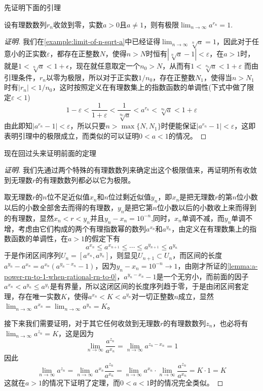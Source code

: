 先证明下面的引理
\begin{lemma}
  \label{lemma:a-power-rn-to-1-when-rational-rn-to-0}
  设有理数数列$r_n$收敛到零，实数$a>0$且$a \neq 1$，则有极限$\lim_{n \to \infty} a^{r_n} = 1$.
\end{lemma}

\begin{proof}[证明]
  我们在\autoref{example:limit-of-n-sqrt-a}中已经证得$\lim_{n \to \infty} \sqrt[n]{a} = 1$，因此对于任意小的正实数$\varepsilon$，都存在正整数$N$，使得$n>N$时恒有$|\sqrt[n]{a}-1|<\varepsilon$，在$a>1$时，就是$1<\sqrt[n]{a}<1+\epsilon$，现在就任意取定一个$n_0>N$，从而有$1<\sqrt[n_0]{a}<1+\varepsilon$ 而由引理条件，$r_n$以零为极限，所以对于正实数$1/n_0$，存在正整数$N_1$，使得当$n>N_1$时有$|r_n|<1/n_0$，这时按照定义在有理数集上的指数函数的单调性(下式中做了限定$\varepsilon<1$)
  \[ 1-\varepsilon<\frac{1}{1+\varepsilon}<\frac{1}{\sqrt[n_0]{a}}<a^{r_n}<\sqrt[n_0]{a}<1+\varepsilon \]
  由此即知$|a^{r_n}-1|<\varepsilon$，所以只要$n>\max\{N, N_1\}$时便能保证$|a^{r_n}-1|<\varepsilon$，这即表明引理中的极限成立，而类似的可以证明$0<a<1$的情况。
\end{proof}

现在回过头来证明前面的定理
\begin{proof}[证明]
  我们先通过两个特殊的有理数数列来确定出这个极限值来，再证明所有收敛到无理数$r$的有理数数列都必以它为极限。

  取无理数$r$的$n$位不足近似值$x_n$和$n$位过剩近似值$y_n$，即$x_n$是把无理数$r$的第$n$位小数以后的小数全部舍去而得的有理数，$y_n$是把它第$n$位小数以后的小数收上来而得到的有理数，显然$x_n<r<y_n$并且$y_n-x_n=10^{-n}$,同时，$x_n$单调不减，而$y_n$单调不增，考虑由它们构成的两个有理指数幂的数列$a^{x_n}$和$a^{y_n}$，由定义在有理数集上的指数函数的单调性，在$a>1$的假定下有
  \[ a^{x_n} \leqslant a^{x_{n+1}} \leqslant \cdots \leqslant a^{y_{n+1}} \leqslant a^{y_n} \]
  于是作闭区间序列$U_n = [a^{x_n},a^{y_n}]$，则显见$U_{n+1} \subset U_n$，而区间的长度$a^{y_n}-a^{x_n}=a^{x_n}(a^{y_n-x_n}-1)$，因为$y_n-x_n=10^{-n} \to 1$，由刚才所证的\autoref{lemma:a-power-rn-to-1-when-rational-rn-to-0}，$a^{y_n-x_n}-1$是一个无穷小，而前面的因子$a^{x_n}<a^{y_n} \leqslant a^{y_1}$是有界量，所以这闭区间的长度序列趋于零，于是由闭区间套定理，存在唯一实数$K$，使得$a^{x_n}<K<a^{y_n}$对一切正整数$n$成立，显然$\lim_{n \to \infty}a^{x_n} = \lim_{n \to \infty}a^{y_n}=K$。

  接下来我们需要证明，对于其它任何收敛到无理数$r$的有理数数列$z_n$，也必将有$\lim_{n \to \infty}a^{z_n}=K$，这是因为
  \[ \lim_{n \to \infty} \frac{a^{z_n}}{a^{x_n}} = \lim_{n \to \infty} a^{z_n-x_n} = 1 \]
  因此
  \[ \lim_{n \to \infty} a^{z_n} = \lim_{n \to \infty} a^{x_n} \frac{a^{z_n}}{a^{x_n}} = \lim_{n \to \infty} a^{x_n} \cdot \lim_{n \to \infty} \frac{a^{z_n}}{a^{x_n}} = K \cdot 1 = K \]
  这就在$a>1$的情况下证明了定理，而$0<a<1$时的情况完全类似。
\end{proof}

